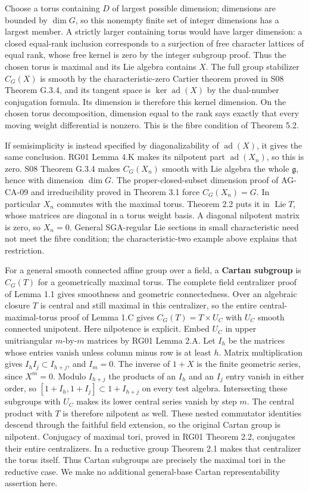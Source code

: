\documentclass[11pt,a4paper,openany]{report}
\newcounter{none}
\begin{document}
Choose a torus containing \(D\) of largest possible dimension; dimensions are bounded by \(\dim G\), so this nonempty finite set of integer dimensions has a largest member. A strictly larger containing torus would have larger dimension: a closed equal-rank inclusion corresponds to a surjection of free character lattices of equal rank, whose free kernel is zero by the integer subgroup proof. Thus the chosen torus is maximal and its Lie algebra contains \(X\). The full group stabilizer \(C_G(X)\) is smooth by the characteristic-zero Cartier theorem proved in S08 Theorem G.3.4, and its tangent space is \(\ker\operatorname{ad}(X)\) by the dual-number conjugation formula. Its dimension is therefore this kernel dimension. On the chosen torus decomposition, dimension equal to the rank says exactly that every moving weight differential is nonzero. This is the fibre condition of Theorem 5.2.

If semisimplicity is instead specified by diagonalizability of \(\operatorname{ad}(X)\), it gives the same conclusion. RG01 Lemma 4.K makes its nilpotent part \(\operatorname{ad}(X_n)\), so this is zero. S08 Theorem G.3.4 makes \(C_G(X_n)\) smooth with Lie algebra the whole \(\mathfrak g\), hence with dimension \(\dim G\). The proper-closed-subset dimension proof of AG-CA-09 and irreducibility proved in Theorem 3.1 force \(C_G(X_n)=G\). In particular \(X_n\) commutes with the maximal torus. Theorem 2.2 puts it in \(\operatorname{Lie}T\), whose matrices are diagonal in a torus weight basis. A diagonal nilpotent matrix is zero, so \(X_n=0\). General SGA-regular Lie sections in small characteristic need not meet the fibre condition; the characteristic-two example above explains that restriction.

For a general smooth connected affine group over a field, a \textbf{Cartan subgroup} is \(C_G(T)\) for a geometrically maximal torus. The complete field centralizer proof of Lemma 1.1 gives smoothness and geometric connectedness. Over an algebraic closure \(T\) is central and still maximal in this centralizer, so the entire central-maximal-torus proof of Lemma 1.C gives \(C_G(T)=T\times U_C\) with \(U_C\) smooth connected unipotent. Here nilpotence is explicit. Embed \(U_C\) in upper unitriangular \(m\)-by-\(m\) matrices by RG01 Lemma 2.A. Let \(I_h\) be the matrices whose entries vanish unless column minus row is at least \(h\). Matrix multiplication gives \(I_hI_j\subset I_{h+j}\), and \(I_m=0\). The inverse of \(1+X\) is the finite geometric series, since \(X^m=0\). Modulo \(I_{h+j}\) the products of an \(I_h\) and an \(I_j\) entry vanish in either order, so \([1+I_h,1+I_j]\subset1+I_{h+j}\) on every test algebra. Intersecting these subgroups with \(U_C\) makes its lower central series vanish by step \(m\). The central product with \(T\) is therefore nilpotent as well. These nested commutator identities descend through the faithful field extension, so the original Cartan group is nilpotent. Conjugacy of maximal tori, proved in RG01 Theorem 2.2, conjugates their entire centralizers. In a reductive group Theorem 2.1 makes that centralizer the torus itself. Thus Cartan subgroups are precisely the maximal tori in the reductive case. We make no additional general-base Cartan representability assertion here.
\end{document}
